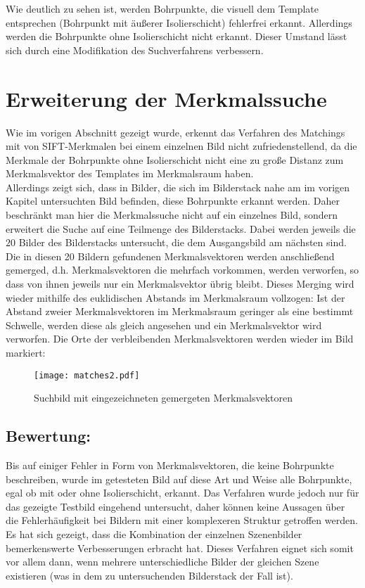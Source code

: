 Wie deutlich zu sehen ist, werden Bohrpunkte, die visuell dem Template entsprechen (Bohrpunkt mit äußerer Isolierschicht) fehlerfrei erkannt. Allerdings werden die Bohrpunkte ohne Isolierschicht nicht erkannt. Dieser Umstand lässt sich durch eine Modifikation des Suchverfahrens verbessern.

\section{Erweiterung der Merkmalssuche}

Wie im vorigen Abschnitt gezeigt wurde, erkennt das Verfahren des Matchings mit von SIFT-Merkmalen bei einem einzelnen Bild nicht zufriedenstellend, da die Merkmale der Bohrpunkte ohne Isolierschicht nicht eine zu große Distanz zum Merkmalsvektor des Templates im Merkmalsraum haben. \\
Allerdings zeigt sich, dass in Bilder, die sich im Bilderstack nahe am im vorigen Kapitel untersuchten Bild befinden, diese Bohrpunkte erkannt werden. Daher beschränkt man hier die Merkmalssuche nicht auf ein einzelnes Bild, sondern erweitert die Suche auf eine Teilmenge des Bilderstacks. Dabei werden jeweils die $20$ Bilder des Bilderstacks untersucht, die dem Ausgangsbild am nächsten sind. \\
Die in diesen 20 Bildern gefundenen Merkmalsvektoren werden anschließend gemerged, d.h. Merkmalsvektoren die mehrfach vorkommen, werden verworfen, so dass von ihnen jeweils nur ein Merkmalsvektor übrig bleibt. Dieses Merging wird wieder mithilfe des euklidischen Abstands im Merkmalsraum vollzogen: Ist der Abstand zweier Merkmalsvektoren im Merkmalsraum geringer als eine bestimmt Schwelle, werden diese als gleich angesehen und ein Merkmalsvektor wird verworfen. Die Orte der verbleibenden Merkmalsvektoren werden wieder im Bild markiert:
\begin{figure}[H]
  \begin{center}
    \texttt{[image: matches2.pdf]}
    \caption{Suchbild mit eingezeichneten gemergeten Merkmalsvektoren}
    \label{fig:suchbild_merge_matches}
  \end{center}
\end{figure}

\subsection{Bewertung:}
Bis auf einiger Fehler in Form von Merkmalsvektoren, die keine Bohrpunkte beschreiben, wurde im getesteten Bild auf diese Art und Weise alle Bohrpunkte, egal ob mit oder ohne Isolierschicht, erkannt. Das Verfahren wurde jedoch nur für das gezeigte Testbild eingehend untersucht, daher können keine Aussagen über die Fehlerhäufigkeit bei Bildern mit einer komplexeren Struktur getroffen werden.\\ 
Es hat sich gezeigt, dass die Kombination der einzelnen Szenenbilder bemerkenswerte Verbesserungen erbracht hat. Dieses Verfahren eignet sich somit vor allem dann, wenn mehrere unterschiedliche Bilder der gleichen Szene existieren (was in dem zu untersuchenden Bilderstack der Fall ist). 
 

